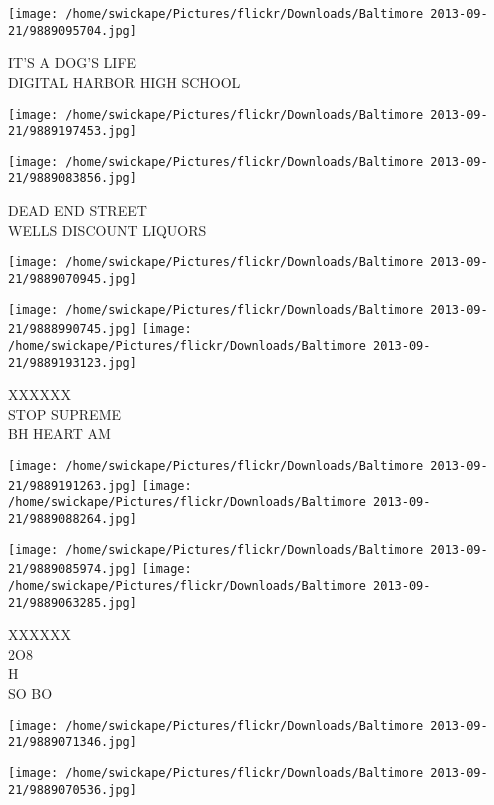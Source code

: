 \documentclass[10pt,letterpaper]{article}
\begin{document}
\vspace{0.25in}
\texttt{[image: /home/swickape/Pictures/flickr/Downloads/Baltimore 2013-09-21/9889095704.jpg]}

IT'S A DOG'S LIFE\\
DIGITAL HARBOR HIGH SCHOOL\\
\pagebreak

\texttt{[image: /home/swickape/Pictures/flickr/Downloads/Baltimore 2013-09-21/9889197453.jpg]}

\vspace{0.25in}
\texttt{[image: /home/swickape/Pictures/flickr/Downloads/Baltimore 2013-09-21/9889083856.jpg]}

DEAD END STREET\\
WELLS DISCOUNT LIQUORS\\
\pagebreak

\texttt{[image: /home/swickape/Pictures/flickr/Downloads/Baltimore 2013-09-21/9889070945.jpg]}

\vspace{0.25in}
\texttt{[image: /home/swickape/Pictures/flickr/Downloads/Baltimore 2013-09-21/9888990745.jpg]}
\texttt{[image: /home/swickape/Pictures/flickr/Downloads/Baltimore 2013-09-21/9889193123.jpg]}

XXXXXX\\
STOP SUPREME\\
BH HEART AM\\
\pagebreak

\texttt{[image: /home/swickape/Pictures/flickr/Downloads/Baltimore 2013-09-21/9889191263.jpg]}
\texttt{[image: /home/swickape/Pictures/flickr/Downloads/Baltimore 2013-09-21/9889088264.jpg]}

\texttt{[image: /home/swickape/Pictures/flickr/Downloads/Baltimore 2013-09-21/9889085974.jpg]}
\texttt{[image: /home/swickape/Pictures/flickr/Downloads/Baltimore 2013-09-21/9889063285.jpg]}

XXXXXX\\
2O8\\
H\\
SO BO\\
\pagebreak

\texttt{[image: /home/swickape/Pictures/flickr/Downloads/Baltimore 2013-09-21/9889071346.jpg]}

\vspace{0.25in}
\texttt{[image: /home/swickape/Pictures/flickr/Downloads/Baltimore 2013-09-21/9889070536.jpg]}
\end{document}
